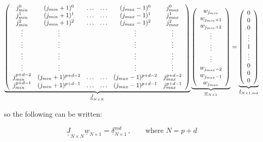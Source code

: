 \documentclass[12pt]{article}
\begin{document}
$$\underbrace{\left( \begin{array}{c c c c c c }
j_{min}^0 & (j_{min}+1)^0 & \ldots &  \ldots & (j_{max} - 1)^0 & j_{max}^0 \\
j_{min}^1 & (j_{min}+1)^1 & \ldots &  \ldots & (j_{max} - 1)^1 & j_{max}^1  \\
j_{min}^2 & (j_{min}+1)^2 & \ldots &  \ldots & (j_{max} - 1)^2 & j_{max}^2  \\
\vdots &   \vdots & & & \vdots & \vdots \\
\vdots &   \vdots & & & \vdots & \vdots \\
\vdots &   \vdots & & & \vdots & \vdots \\
\vdots &   \vdots & & & \vdots & \vdots \\
j_{min}^{p + d - 2} & (j_{min}+1)^{p + d - 2} & \ldots &  \ldots & (j_{max} - 1)^{p + d - 2} & j_{max}^{p + d - 2}  \\
j_{min}^{p + d - 1} & (j_{min}+1)^{p + d - 1} & \ldots &  \ldots & (j_{max} - 1)^{p + d - 1} & j_{max}^{p + d - 1}  \\
\end{array} \right)}_{\underline{\underline{J}}_{N \times N}}
\underbrace{\left( \begin{array}{c}
w_{j_{min}} \\
w_{j_{min}+1} \\
w_{j_{min}+2} \\
\vdots \\
\vdots \\
\vdots \\
w_{j_{max} - 2} \\
w_{j_{max} - 1} \\
w_{j_{max}} 
\end{array} \right)}_{\underline{w}_{N\times 1}}
= 
\underbrace{\left( \begin{array}{c}
0 \\
0 \\
0 \\
\vdots \\
1 \\
\vdots  \\
0 \\
0 \\
0 \end{array} \right)}_{\underline{\delta}_{N\times 1, md}} $$

so the following can be written:

$$\boxed{\underline{\underline{J}}_{N\times N} \underline{w}_{N\times 1} = \underline{\delta}^{md}_{N\times 1}}\, , \qquad \text{where } N = p + d$$
\end{document}
